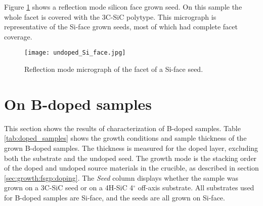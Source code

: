 Figure \ref{fig:silicon_seed} shows a reflection mode silicon face grown seed. On this sample the whole facet is covered with the 3C-SiC polytype. This micrograph is representative of the Si-face grown seeds, most of which had complete facet coverage. 

\begin{figure}[H]
\begin{center}
\texttt{[image: undoped\_Si\_face.jpg]}
\caption{Reflection mode micrograph of the facet of a Si-face seed.
\label{fig:silicon_seed}}
\end{center}
\end{figure}




\section{On B-doped samples}
\label{sec:results:doped}
This section shows the results of characterization of B-doped samples. Table \ref{tab:doped_samples} shows the growth conditions and sample thickness of the grown B-doped samples. The thickness is measured for the doped layer, excluding both the substrate and the undoped seed. The growth mode is the stacking order of the doped and undoped source materials in the crucible, as described in section \ref{sec:growth:fsgp:doping}. The \emph{Seed} column displays whether the sample was grown on a 3C-SiC seed or on a 4H-SiC 4$^\circ$ off-axis substrate. All substrates used for B-doped samples are Si-face, and the seeds are all grown on Si-face. 

